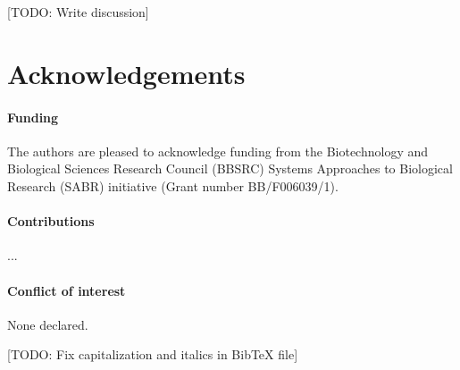 \documentclass{bioinfo}
\newcommand{\note}[1]{{\color{red}[#1]}}
\begin{document}

\note{TODO: Write discussion}

\section*{Acknowledgements}

\paragraph{Funding\textcolon} The authors are pleased to acknowledge funding from the Biotechnology and Biological Sciences Research Council (BBSRC) Systems Approaches to Biological Research (SABR) initiative (Grant number BB/F006039/1). 

\paragraph{Contributions\textcolon} ...

\paragraph{Conflict of interest\textcolon} None declared.





\note{TODO: Fix capitalization and italics in BibTeX file}
\end{document}
